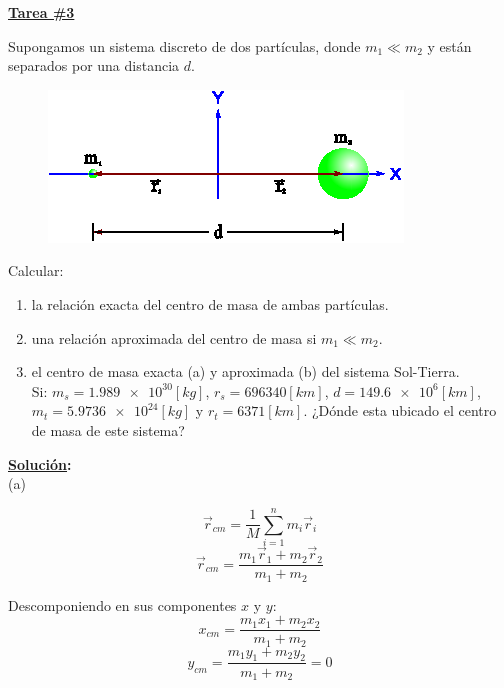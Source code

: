 \documentclass[letter,11pt]{article}
\begin{document}
\begin{center}
    {\Large \bf{\underline{Tarea \#3}}}
\end{center}

Supongamos un sistema discreto de dos partículas, donde $m_1 \ll m_2$ y están
separados por una distancia $d$.

\begin{figure}[!h]
\centering
\includegraphics[scale=2.5]{resources/f1.eps}
\end{figure}

Calcular:

\begin{enumerate}[label=(\alph*)]
    \item la relación exacta del centro de masa de ambas partículas.
    \item una relación aproximada del centro de masa si $m_1 \ll m_2$.
    \item el centro de masa exacta (a) y aproximada (b) del sistema
        Sol-Tierra. \\
        Si: $m_s = \num{1.989e30} [kg]$, $r_s = 696340 [km]$,
        $d = \num{149.6e6} [km]$, $m_t = \num{5.9736e24} [kg]$ y
        $r_t = 6371 [km]$. ¿Dónde esta ubicado el centro de masa de este
        sistema?
\end{enumerate}

\textbf{\underline{Solución}:} \\

(a)

\begin{equation*}
    \vec{r}_{cm} = \frac{1}{M} \sum_{i=1}^{n} m_i \vec{r}_i
\end{equation*}
\begin{equation*}
    \vec{r}_{cm} = \frac{m_1 \vec{r}_1 + m_2 \vec{r}_2}{m_1 + m_2}
\end{equation*}

Descomponiendo en sus componentes $x$ y $y$:
\begin{equation*}
    x_{cm} = \frac{m_1 x_1 + m_2 x_2}{m_1 + m_2}
\end{equation*}
\begin{equation*}
    y_{cm} = \frac{m_1 y_1 + m_2 y_2}{m_1 + m_2} = 0
\end{equation*}
\end{document}
